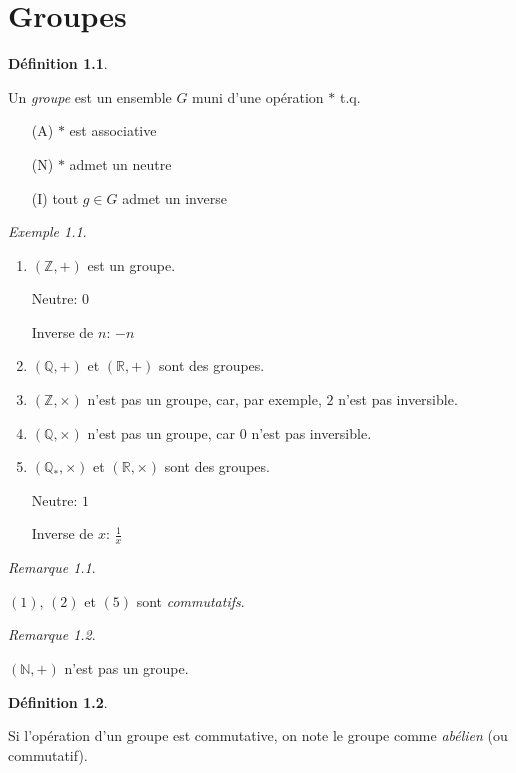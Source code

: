 \documentclass{report}
\theoremstyle{definition}
\newtheorem*{defin}{D\'efinition}
\theoremstyle{remark}
\newtheorem*{exem}{Exemple}
\newtheorem*{rema}{Remarque}
\begin{document}
	\chapter{Groupes}
	\begin{defin}
		~

		Un \emph{groupe} est un ensemble $G$ muni d'une op\'eration $*$ t.q.
		\begin{enumerate}
			\item[(A)] $*$ est associative
			\item[(N)] $*$ admet un neutre
			\item[(I)] tout $g \in G$ admet un inverse
		\end{enumerate}
	\end{defin}
	\begin{exem}
		~

		\begin{enumerate}[label=(\arabic*)]
			\item $(\mathbb{Z},+)$ est un groupe.

			Neutre: $0$

			Inverse de $n$: $-n$
			\item $(\mathbb{Q},+)$ et $(\mathbb{R},+)$ sont des groupes.
			\item $(\mathbb{Z},\times)$ n'est pas un groupe, car, par exemple, $2$ n'est pas inversible.
			\item $(\mathbb{Q},\times)$ n'est pas un groupe, car $0$ n'est pas inversible.
			\item $(\mathbb{Q}_*,\times)$ et $(\mathbb{R},\times)$ sont des groupes.

			Neutre: $1$

			Inverse de $x$: $\frac{1}{x}$
		\end{enumerate}
		\begin{rema}
			~

			$(1)$, $(2)$ et $(5)$ sont \emph{commutatifs}.
		\end{rema}
		\begin{rema}
			~

			$(\mathbb{N},+)$ n'est pas un groupe.
		\end{rema}
	\end{exem}
	\begin{defin}
		~

		Si l'op\'eration d'un groupe est commutative, on note le groupe comme \emph{ab\'elien} (ou commutatif).
	\end{defin}
\end{document}
